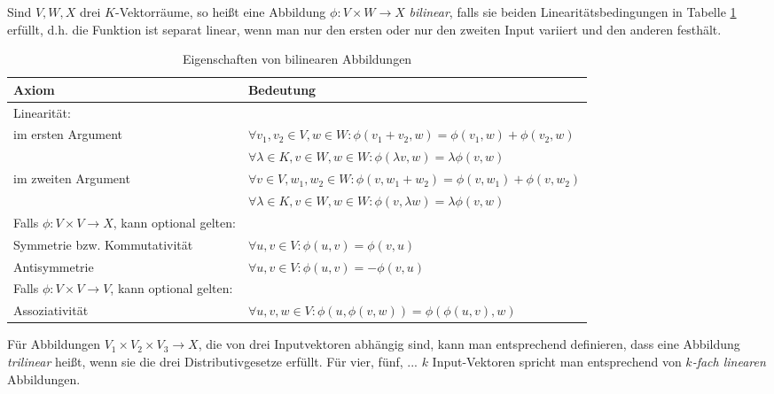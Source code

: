 \begin{definition}\label{bilineare_abb:def}
Sind $V,W,X$ drei $K$-Vektorräume, so heißt eine Abbildung $\phi: V\times W\to X$ \emph{bilinear}, falls sie beiden Linearitätsbedingungen in Tabelle \ref{bilineare_abb:def_table} erfüllt, d.h. die Funktion ist separat linear, wenn man nur den ersten oder nur den zweiten Input variiert und den anderen festhält.

\begin{table}[!ht]
    \setlength\extrarowheight{10pt} %
    \hspace{-0.1\textwidth}
    \begin{tabularx}{1.2\textwidth}{p{6.5cm} p{9.5cm}}
        \toprule
        \textbf{Axiom}                  & \textbf{Bedeutung} \hspace{0.5cm} \\ 
        \midrule
        Linearität: \\
        \hspace{1cm}im ersten Argument  & $\forall v_1,v_2\in V, w\in W: \phi(v_1+v_2,w) = \phi(v_1,w) + \phi(v_2,w)$ \\
                                        & $\forall \lambda\in K, v\in W, w\in W: \phi(\lambda v, w) = \lambda \phi(v,w)$ \\
        \hspace{1cm}im zweiten Argument & $\forall v\in V, w_1, w_2\in W: \phi(v,w_1+w_2) = \phi(v,w_1) + \phi(v,w_2)$ \\
                                        & $\forall \lambda\in K, v\in W, w\in W: \phi(v, \lambda w) = \lambda \phi(v,w)$ \\
        Falls $\phi: V\times V \to X$, kann optional gelten: \\
        \hspace{1cm}Symmetrie bzw. Kommutativität & $\forall u,v\in V: \phi(u,v) = \phi(v,u)$ \\
        \hspace{1cm}Antisymmetrie & $\forall u,v\in V: \phi(u,v) = -\phi(v,u)$ \\
        Falls $\phi: V\times V\to V$, kann optional gelten: \\
        \hspace{1cm}Assoziativität & $\forall u,v,w\in V: \phi(u,\phi(v,w)) = \phi(\phi(u,v),w)$ \\
        \bottomrule
    \end{tabularx}
    \label{bilineare_abb:def_table}
    \caption{Eigenschaften von bilinearen Abbildungen}
\end{table}

Für Abbildungen $V_1\times V_2\times V_3\to X$, die von drei Inputvektoren abhängig sind, kann man entsprechend definieren, dass eine Abbildung \emph{trilinear} heißt, wenn sie die drei Distributivgesetze erfüllt. Für vier, fünf, ... $k$ Input-Vektoren spricht man entsprechend von \emph{$k$-fach linearen} Abbildungen.
\end{definition}

